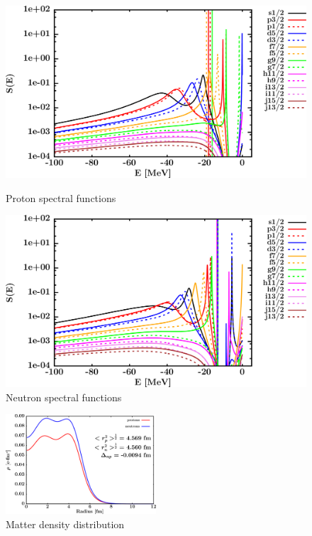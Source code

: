 \begin{figure}[H]
    \centering
    \begin{minipage}{0.45\textwidth}
        \centering
        \includegraphics[width=1.0\textwidth]{figures/sn112_protonSpectralFunctions.png}
        \caption{Proton spectral functions}
        \label{DOMFitData_sn112_proton_spectralFunctions}
    \end{minipage}\hfill
    \begin{minipage}{0.45\textwidth}
        \centering
        \includegraphics[width=1.0\textwidth]{figures/sn112_neutronSpectralFunctions.png}
        \caption{Neutron spectral functions}
        \label{DOMFitData_sn112_neutron_spectralFunctions}
    \end{minipage}
\end{figure}

\begin{figure}[H]
    \centering
    \includegraphics[width = 0.5\textwidth]{figures/sn112_matterDensity.png}
    \caption{Matter density distribution}
    \label{DOMFitData_sn112_matterDensity}
\end{figure}

